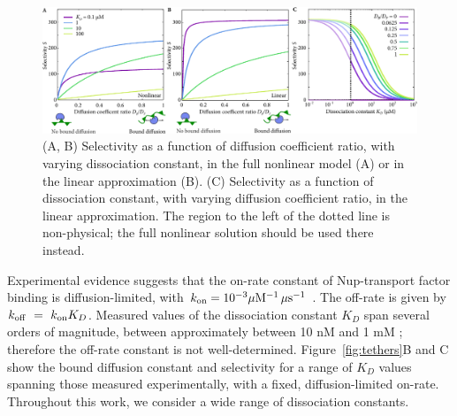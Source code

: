 \begin{figure}[t!]
\centering
\includegraphics[width=\linewidth]{figs/ch02/linear-selectivity.pdf}
\caption[Selectivity in the linear approximation.]{(A, B) Selectivity as a function of diffusion coefficient
  ratio, with varying dissociation constant, in the full nonlinear
  model (A) or in the linear approximation (B).  (C) Selectivity as a
  function of dissociation constant, with varying diffusion
  coefficient ratio, in the linear approximation.  The region to the
  left of the dotted line is non-physical; the full nonlinear solution
  should be used there instead.}
\label{fig:linear-selectivity}
\end{figure}

Experimental evidence suggests that the on-rate constant of Nup-transport factor binding is diffusion-limited, with $k_{\rm on} = 10^{-3}\mu \mathrm{M}^{-1} \, \mu \mathrm{s}^{-1}$ \cite{milles15, hough15}.  The off-rate is given by $k_{\rm off} ~=~k_{\rm on} K_D$.  Measured values of the dissociation constant $K_D$ span several orders of magnitude, between approximately between 10 nM and 1 mM \cite{pyhtila03, gilchrist02, tetenbaum-novatt12-1, milles15, timney16, vovk16, hayama18}; therefore the off-rate constant is not well-determined.  Figure~\ref{fig:tethers}B and C show the bound diffusion constant and selectivity for a range of $K_D$ values spanning those measured experimentally, with a fixed, diffusion-limited on-rate.  Throughout this work, we consider a wide range of dissociation constants.

